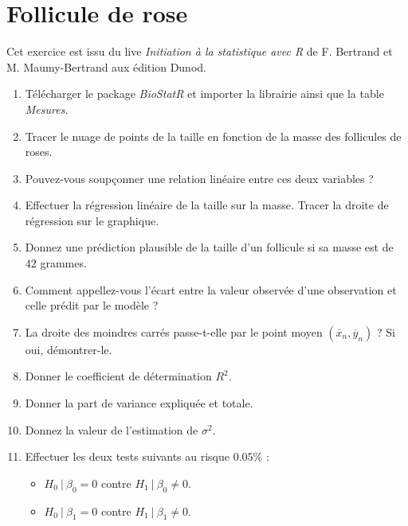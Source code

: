 \section{Follicule de rose}

Cet exercice est issu du live \textit{Initiation à la statistique avec R} de F. Bertrand et M. Maumy-Bertrand aux édition Dunod.\\

\begin{enumerate}
\item Télécharger le package \textit{BioStatR} et importer la librairie ainsi que la table \textit{Mesures}.
\item Tracer le nuage de points de la taille en fonction de la masse des follicules de roses.
\item Pouvez-vous soupçonner une relation linéaire entre ces deux variables ?
\item Effectuer la régression linéaire de la taille sur la masse. Tracer la droite de régression sur le graphique.
\item Donnez une prédiction plausible de la taille d'un follicule si sa masse est de $42$ grammes.
\item Comment appellez-vous l'écart entre la valeur observée d'une observation et celle prédit par le modèle ?
\item La droite des moindres carrés passe-t-elle par le point moyen $(\overline x_n, \overline y_n)$ ? Si oui, démontrer-le.
\item Donner le coefficient de détermination $R^2$.
\item Donner la part de variance expliquée et totale.
\item Donnez la valeur de l'estimation de $\sigma^2$.
\item Effectuer les deux tests suivants au risque $0.05\%$ :
\begin{itemize}
\item $H_0 \ | \ \beta_0 = 0$ contre $H_1 \ | \ \beta_0 \neq 0$.
\item $H_0 \ | \ \beta_1 = 0$ contre $H_1 \ | \ \beta_1 \neq 0$.
\end{itemize}
\end{enumerate}
